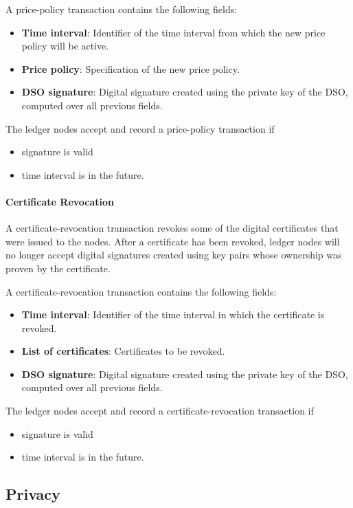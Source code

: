 \documentclass[chi_draft]{sigchi}
\begin{document}
A price-policy transaction contains the following fields:
\begin{itemize}
\item \textbf{Time interval}: Identifier of the time interval from which the new price policy will be active.
\item \textbf{Price policy}: Specification of the new price policy.
\item \textbf{DSO signature}: Digital signature created using the private key of the DSO, computed over all previous fields.
\end{itemize}

The ledger nodes accept and record a price-policy transaction if
\begin{itemize}
\item signature is valid
\item time interval is in the future.
\end{itemize}

\paragraph{Certificate Revocation}
A certificate-revocation transaction revokes some of the digital certificates that were issued to the nodes.
After a certificate has been revoked, ledger nodes will no longer accept digital signatures created using key pairs whose ownership was proven by the certificate.

A certificate-revocation transaction contains the following fields:
\begin{itemize}
\item \textbf{Time interval}: Identifier of the time interval in which the certificate is revoked.
\item \textbf{List of certificates}: Certificates to be revoked.
\item \textbf{DSO signature}: Digital signature created using the private key of the DSO, computed over all previous fields.
\end{itemize}

The ledger nodes accept and record a certificate-revocation transaction if
\begin{itemize}
\item signature is valid
\item time interval is in the future.
\end{itemize}


\subsection{Privacy}
\end{document}

